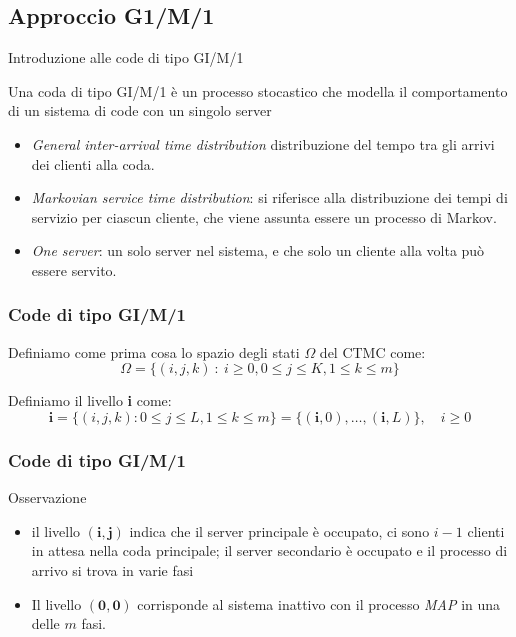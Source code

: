 \documentclass{beamer}
\begin{document}
\subsection{Approccio G1/M/1}


\begin{frame}{Introduzione alle code di tipo GI/M/1}
    \begin{block}{}
        Una coda di tipo GI/M/1 è un processo stocastico che modella il comportamento di un sistema di code con un singolo server
    \end{block}
    \begin{itemize}
        \item [GI] \emph{General inter-arrival time distribution} distribuzione del tempo tra gli arrivi dei clienti alla coda.
        \item [M] \emph{Markovian service time distribution}: si riferisce alla distribuzione dei tempi di servizio per ciascun cliente, che viene assunta essere un processo di Markov.
        \item [1] \emph{One server}: un solo server nel sistema, e che solo un cliente alla volta può essere servito.
    \end{itemize}
\end{frame}


\begin{frame}
    \frametitle{Code di tipo GI/M/1}
    \begin{block}{}
            Definiamo come prima cosa lo spazio degli stati $\Omega$ del CTMC come:
            $$\Omega = \{ (i,j,k) ~ : ~ i \geq 0, 0 \leq j \leq K, 1 \leq k \leq m \}$$
    \end{block}
    Definiamo il livello \textbf{i} come:
    \begin{equation*}
        \textbf{i} = \{(i, j, k) : 0 \leq j \leq L, 1 \leq k \leq m\} = \{(\textbf{i}, 0), \dots, (\textbf{i}, L)\}, \quad i \geq 0
    \end{equation*}
\end{frame}


\begin{frame}
    \frametitle{Code di tipo GI/M/1}
    \begin{block}{Osservazione}
        \begin{itemize}
            \item il livello $(\textbf{i},\textbf{j})$ indica che il server principale è occupato, ci sono $i-1$ clienti in attesa nella coda principale; il server secondario è occupato e il processo di arrivo si trova in varie fasi
            \item  Il livello $(\textbf{0},\textbf{0})$ corrisponde al sistema inattivo con il processo \emph{MAP} in una delle $m$ fasi.
        \end{itemize}
    \end{block}
\end{frame}
\end{document}
